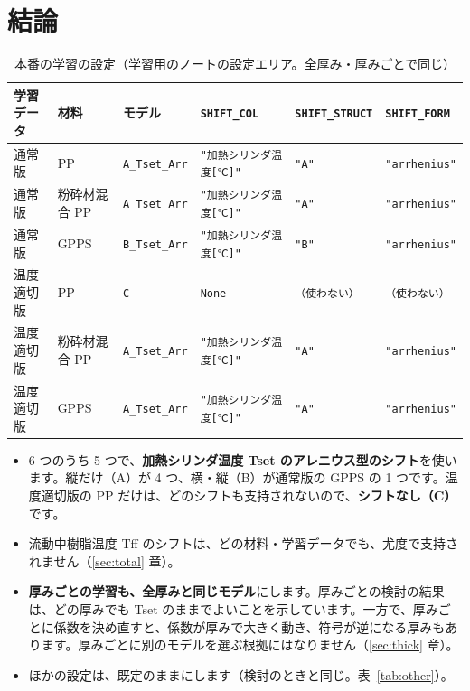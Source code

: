 \documentclass[paper=a4paper,fontsize=10.5pt,line_length=44zw,number_of_lines=40]{jlreq}
\let\origtextbf\textbf
\renewcommand{\textbf}[1]{\origtextbf{\gtfamily #1}}   %
\begin{document}
\section{結論}\label{sec:concl}
\begin{table}[H]\centering\footnotesize
\caption{本番の学習の設定（学習用のノートの設定エリア。全厚み・厚みごとで同じ）}\label{tab:concl}
\begin{tabular}{llllll}
\toprule
学習データ & 材料 & モデル & \texttt{SHIFT\_\allowbreak{}COL} & \texttt{SHIFT\_\allowbreak{}STRUCT} & \texttt{SHIFT\_\allowbreak{}FORM} \\
\midrule
通常版 & PP & \texttt{A\_\allowbreak{}Tset\_\allowbreak{}Arr} & \texttt{"加熱シリンダ温度[℃]"} & \texttt{"A"} & \texttt{"arrhenius"} \\
通常版 & 粉砕材混合 PP & \texttt{A\_\allowbreak{}Tset\_\allowbreak{}Arr} & \texttt{"加熱シリンダ温度[℃]"} & \texttt{"A"} & \texttt{"arrhenius"} \\
通常版 & GPPS & \texttt{B\_\allowbreak{}Tset\_\allowbreak{}Arr} & \texttt{"加熱シリンダ温度[℃]"} & \texttt{"B"} & \texttt{"arrhenius"} \\
\midrule
温度適切版 & PP & \texttt{C} & \texttt{None} & \texttt{（使わない）} & \texttt{（使わない）} \\
温度適切版 & 粉砕材混合 PP & \texttt{A\_\allowbreak{}Tset\_\allowbreak{}Arr} & \texttt{"加熱シリンダ温度[℃]"} & \texttt{"A"} & \texttt{"arrhenius"} \\
温度適切版 & GPPS & \texttt{A\_\allowbreak{}Tset\_\allowbreak{}Arr} & \texttt{"加熱シリンダ温度[℃]"} & \texttt{"A"} & \texttt{"arrhenius"} \\
\bottomrule
\end{tabular}
\end{table}
\begin{itemize}[itemsep=0.3ex,topsep=0.4ex]
\item 6 つのうち 5 つで、\textbf{加熱シリンダ温度 Tset のアレニウス型のシフト}を使います。縦だけ（A）が 4 つ、横・縦（B）が通常版の GPPS の 1 つです。温度適切版の PP だけは、どのシフトも支持されないので、\textbf{シフトなし（C）}です。
\item 流動中樹脂温度 Tff のシフトは、どの材料・学習データでも、尤度で支持されません（\ref{sec:total} 章）。
\item \textbf{厚みごとの学習も、全厚みと同じモデル}にします。厚みごとの検討の結果は、どの厚みでも Tset のままでよいことを示しています。一方で、厚みごとに係数を決め直すと、係数が厚みで大きく動き、符号が逆になる厚みもあります。厚みごとに別のモデルを選ぶ根拠にはなりません（\ref{sec:thick} 章）。
\item ほかの設定は、既定のままにします（検討のときと同じ。表~\ref{tab:other}）。
\end{itemize}
\end{document}
